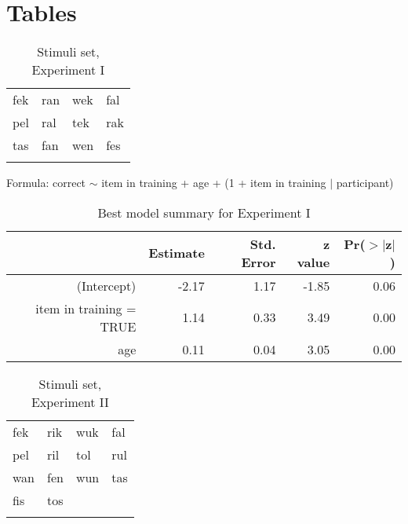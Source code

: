 \documentclass{frontiersSCNS} %
\begin{document}


\clearpage
\section*{Tables}

\begin{table}[ht]
\begin{center}
\begin{tabular}{llll}
\hline
fek&
ran&
wek&
fal\\
pel&
ral&
tek&
rak\\
tas&
fan&
wen&
fes\\
&&\\
\hline
\end{tabular}
\end{center}
\caption{ \large Stimuli set, Experiment I}
\label{exp1stimtable}
\end{table}

\vspace{1cm}

\begin{table}[ht]
Formula: correct $\sim{}$ item in training + age + (1 + item in training $|$ participant)\\
\centering
\begin{tabular}{rrrrr}
  \hline
 & Estimate & Std. Error & z value & Pr($>$$|$z$|$) \\ 
  \hline
(Intercept) & -2.17 & 1.17 & -1.85 & 0.06 \\ 
  item in training = TRUE & 1.14 & 0.33 & 3.49 & 0.00 \\ 
  age & 0.11 & 0.04 & 3.05 & 0.00 \\ 
   \hline
\end{tabular}
\caption{ \large Best model summary for Experiment I}
\label{exp1summary}
\end{table}

\vspace{1cm}


\begin{table}[ht]
\begin{center}
\begin{tabular}{llll}
\hline
fek&
rik&
wuk&
fal\\
pel&
ril&
tol&
rul\\
wan&
fen&
wun&
tas\\
fis&
tos&&\\
\hline

\vspace{1cm}


\end{tabular}
\end{center}
\caption{ \large Stimuli set, Experiment II}
\label{exp2stimtable}
\end{table}
\end{document}
